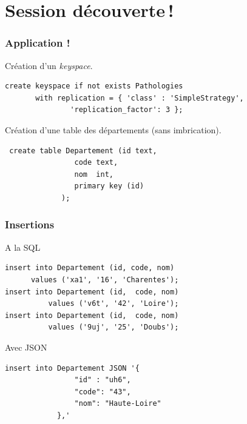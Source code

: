 \section{Session découverte\,!}


\begin{frame}[fragile]
\frametitle{Application !}

Création d'un \textit{keyspace}.

\begin{verbatim}
create keyspace if not exists Pathologies 
       with replication = { 'class' : 'SimpleStrategy',
               'replication_factor': 3 };
\end{verbatim}

\vfill

Création d'une table des départements (sans imbrication).

\begin{verbatim}
 create table Departement (id text, 
                code text, 
                nom  int, 
                primary key (id) 
             );
\end{verbatim}
\end{frame}


\begin{frame}[fragile]
\frametitle{Insertions}

A la SQL

\begin{verbatim}
insert into Departement (id, code, nom)  
      values ('xa1', '16', 'Charentes');
insert into Departement (id,  code, nom)  
          values ('v6t', '42', 'Loire');
insert into Departement (id,  code, nom)  
          values ('9uj', '25', 'Doubs');
\end{verbatim}

\vfill

Avec JSON

\begin{verbatim}
insert into Departement JSON '{
				"id" : "uh6",
				"code": "43",
				"nom": "Haute-Loire"
			},' 
\end{verbatim}
\end{frame}



